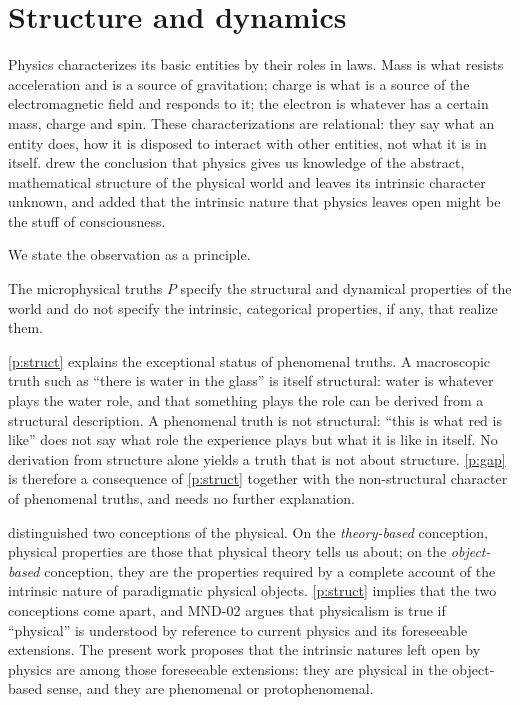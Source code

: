 \documentclass{situationist-preprint}
\begin{document}
\section{Structure and dynamics}

Physics characterizes its basic entities by their roles in laws. Mass is what resists acceleration and is a source of gravitation; charge is what is a source of the electromagnetic field and responds to it; the electron is whatever has a certain mass, charge and spin. These characterizations are relational: they say what an entity does, how it is disposed to interact with other entities, not what it is in itself. \citet{Russell1927} drew the conclusion that physics gives us knowledge of the abstract, mathematical structure of the physical world and leaves its intrinsic character unknown, and \citet{Eddington1928} added that the intrinsic nature that physics leaves open might be the stuff of consciousness.

We state the observation as a principle.

\begin{principle}\label{p:struct}
The microphysical truths $P$ specify the structural and dynamical properties of the world and do not specify the intrinsic, categorical properties, if any, that realize them.
\end{principle}

\ref{p:struct} explains the exceptional status of phenomenal truths. A macroscopic truth such as \enquote{there is water in the glass} is itself structural: water is whatever plays the water role, and that something plays the role can be derived from a structural description. A phenomenal truth is not structural: \enquote{this is what red is like} does not say what role the experience plays but what it is like in itself. No derivation from structure alone yields a truth that is not about structure. \ref{p:gap} is therefore a consequence of \ref{p:struct} together with the non-structural character of phenomenal truths, and needs no further explanation.

\citet{Stoljar2001} distinguished two conceptions of the physical. On the \emph{theory-based} conception, physical properties are those that physical theory tells us about; on the \emph{object-based} conception, they are the properties required by a complete account of the intrinsic nature of paradigmatic physical objects. \ref{p:struct} implies that the two conceptions come apart, and MND-02 argues that physicalism is true if \enquote{physical} is understood by reference to current physics and its foreseeable extensions. The present work proposes that the intrinsic natures left open by physics are among those foreseeable extensions: they are physical in the object-based sense, and they are phenomenal or protophenomenal.
\end{document}

